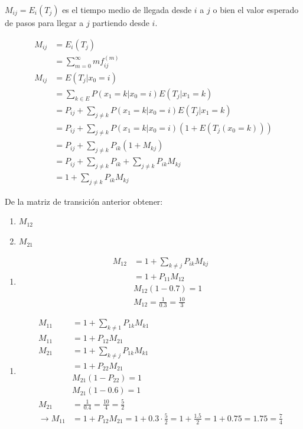 $M_{ij} =E_{i}(T_{j})$ es el tiempo medio de llegada desde $i$ a $j$ o bien el valor esperado de pasos para llegar a $j$ partiendo desde $i$.

\begin{align*}
    M_{ij} & = E_{i}(T_{j}) \\
    & = \sum_{m=0}^{\infty} m f_{ij}^{(m)} \\
    M_{ij} & = E(T_{j} | x_{0} = i) \\
    & = \sum_{k \in E} P(x_{1} = k | x_{0} = i) E(T_{j} | x_{1} = k) \\
    & = P_{ij} + \sum_{j \neq k} P(x_{1} = k | x_{0} = i) E(T_{j} | x_{1} = k) \\
    & = P_{ij} + \sum_{j \neq k} P(x_{1} = k | x_{0} = i) (1 + E(T_{j} (x_{0} = k))) \\
    & = P_{ij} + \sum_{j \neq k} P_{ik} (1 + M_{kj}) \\
    & = P_{ij} + \sum_{j \neq k} P_{ik} + \sum_{j \neq k} P_{ik} M_{kj} \\
    & = 1 + \sum_{j \neq k} P_{ik} M_{kj}
\end{align*}

\begin{example}{}{}
    De la matriz de transición anterior obtener:
    \begin{enumerate}
        \item $M_{12}$
        \item $M_{21}$
    \end{enumerate}
\end{example}

\begin{enumerate}
    \item \begin{align*}
        M_{12} & = 1 + \sum_{k \neq j} P_{ik} M_{kj} \\
         & = 1 + P_{11} M_{12} \\
         & M_{12} (1 - 0.7)= 1 \\
         & M_{12} = \frac{1}{0.3} = \frac{10}{3}
    \end{align*}
\end{enumerate}

\begin{enumerate}
    \item \begin{align*}
        M_{11} & = 1 + \sum_{k \neq 1} P_{1k} M_{k1} \\
        M_{11} & = 1 + P_{12} M_{21} \\
        M_{21} & = 1 + \sum_{k \neq j}P_{1k}M_{k1} \\
         & = 1 + P_{22}M_{21} \\
        & M_{21}(1 - P_{22}) = 1 \\
        & M_{21} (1 - 0.6) = 1 \\
        M_{21} & = \frac{1}{0.4} = \frac{10}{4} = \frac{5}{2} \\
        \rightarrow M_{11} & = 1 + P_{12} M_{21} = 1 + 0.3 \cdot \frac{5}{2} = 1 + \frac{1.5}{2} = 1 + 0.75 = 1.75 = \frac{7}{4}      
    \end{align*}
\end{enumerate}

